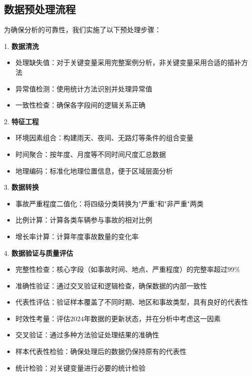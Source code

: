 \documentclass[12pt,a4paper]{article}
\begin{document}
\FloatBarrier

\subsection{数据预处理流程}

为确保分析的可靠性，我们实施了以下预处理步骤：

1. \textbf{数据清洗}
   \begin{itemize}
   \item 处理缺失值：对于关键变量采用完整案例分析，非关键变量采用合适的插补方法
   \item 异常值检测：使用统计方法识别并处理异常值
   \item 一致性检查：确保各字段间的逻辑关系正确
   \end{itemize}

2. \textbf{特征工程}
   \begin{itemize}
   \item 环境因素组合：构建雨天、夜间、无路灯等条件的组合变量
   \item 时间聚合：按年度、月度等不同时间尺度汇总数据
   \item 地理编码：标准化地理位置信息，便于区域层面分析
   \end{itemize}

3. \textbf{数据转换}
   \begin{itemize}
   \item 事故严重程度二值化：将四级分类转换为"严重"和"非严重"两类
   \item 比例计算：计算各类车辆参与事故的相对比例
   \item 增长率计算：计算年度事故数量的变化率
   \end{itemize}

4. \textbf{数据验证与质量评估}
   \begin{itemize}
   \item 完整性检查：核心字段（如事故时间、地点、严重程度）的完整率超过$99\%$
   \item 准确性验证：通过交叉验证和逻辑检查，确保数据的内部一致性
   \item 代表性评估：验证样本覆盖了不同时期、地区和事故类型，具有良好的代表性
   \item 时效性考量：评估$2024$年数据的更新状态，并在分析中考虑这一因素
   \item 交叉验证：通过多种方法验证处理结果的准确性
   \item 样本代表性检验：确保处理后的数据仍保持原有的代表性
   \item 统计检验：对关键变量进行必要的统计检验
   \end{itemize}
\end{document}
